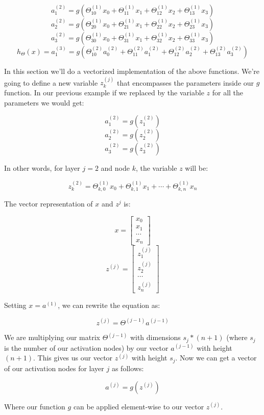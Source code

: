\documentclass[UTF8]{article}
\begin{document}
\[ a_1^{(2)} = g(\Theta_{10}^{(1)}x_0 + \Theta_{11}^{(1)}x_1 + \Theta_{12}^{(1)}x_2 + \Theta_{13}^{(1)}x_3) \]
\[ a_2^{(2)} = g(\Theta_{20}^{(1)}x_0 + \Theta_{21}^{(1)}x_1 + \Theta_{22}^{(1)}x_2 + \Theta_{23}^{(1)}x_3) \]
\[ a_3^{(2)} = g(\Theta_{30}^{(1)}x_0 + \Theta_{31}^{(1)}x_1 + \Theta_{32}^{(1)}x_2 + \Theta_{33}^{(1)}x_3) \]
\[ h_\Theta(x) = a_1^{(3)} = g(\Theta_{10}^{(2)}a_0^{(2)} + \Theta_{11}^{(2)}a_1^{(2)} + \Theta_{12}^{(2)}a_2^{(2)} + \Theta_{13}^{(2)}a_3^{(2)}) \]

In this section we'll do a vectorized implementation of the above functions. We're going to define a new variable $z^{(j)}_k$ that encompasses the parameters inside our $g$ function. In our previous example if we replaced by the variable $z$ for all the parameters we would get:

\[a_1^{(2)} = g(z_1^{(2)}) \]
\[ a_2^{(2)} = g(z_2^{(2)}) \]
\[ a_3^{(2)} = g(z_3^{(2)}) \]

In other words, for layer $j=2$ and node $k$, the variable $z$ will be:

\[z_k^{(2)} = \Theta_{k,0}^{(1)}x_0 + \Theta_{k,1}^{(1)}x_1 + \cdots + \Theta_{k,n}^{(1)}x_n\]

The vector representation of $x$ and $z^j$ is:

\[x = \begin{bmatrix}x_0 \\ x_1 \\ \cdots \\ x_n\end{bmatrix} \]
\[z^{(j)} = \begin{bmatrix}z_1^{(j)} \\ z_2^{(j)} \\ \cdots \\ z_n^{(j)}\end{bmatrix}\]

Setting $x=a^{(1)}$, we can rewrite the equation as:

\[z^{(j)} = \Theta^{(j-1)}a^{(j-1)}\]

We are multiplying our matrix $\Theta^{(j-1)}$ with dimensions $s_j*(n+1)$ (where $s_j$ is the number of our activation nodes) by our vector $a^{(j-1)}$ with height $(n+1)$. This gives us our vector $z^{(j)}$ with height $s_j$. Now we can get a vector of our activation nodes for layer $j$ as follows:

\[a^{(j)} = g(z^{(j)})\]

Where our function $g$ can be applied element-wise to our vector $z^{(j)}$.
\end{document}
